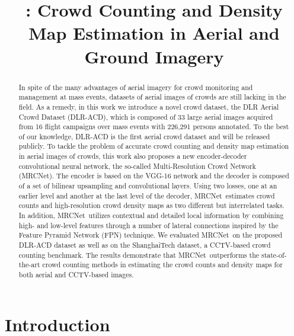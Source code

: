 \documentclass{bmvc2k}
\title{\XNET: Crowd Counting and Density Map Estimation in Aerial and Ground Imagery}
\newcommand{\XNET}{MRCNet}
\begin{document}
\maketitle

\begin{abstract}
In spite of the many advantages of aerial imagery for crowd monitoring and management at mass events, datasets of aerial images of crowds are still lacking in the field. As a remedy, in this work we introduce a novel crowd dataset, the DLR Aerial Crowd Dataset (DLR-ACD), which is composed of 33 large aerial images acquired from 16 flight campaigns over mass events with 226,291 persons annotated. To the best of our knowledge, DLR-ACD is the first aerial crowd dataset and will be released publicly. 
To tackle the problem of accurate crowd counting and density map estimation in aerial images of crowds, this work also proposes a new encoder-decoder convolutional neural network, the so-called Multi-Resolution Crowd Network (\XNET).
The encoder is based on the VGG-16 network and the decoder is composed of a set of bilinear upsampling and convolutional layers. Using two losses, one at an earlier level and another at the last level of the decoder, \XNET~estimates crowd counts and high-resolution crowd density maps as two different but interrelated tasks.
In addition, \XNET~utilizes contextual and detailed local information by combining high- and low-level features through a number of lateral connections inspired by the Feature Pyramid Network (FPN) technique.
We evaluated \XNET~on the proposed DLR-ACD dataset as well as on the ShanghaiTech dataset, a CCTV-based crowd counting benchmark. The results demonstrate that {\XNET}~outperforms the state-of-the-art crowd counting methods in estimating the crowd counts and density maps for both aerial and CCTV-based images.



\end{abstract}

\section{Introduction}
\label{sec:intro}
\end{document}
